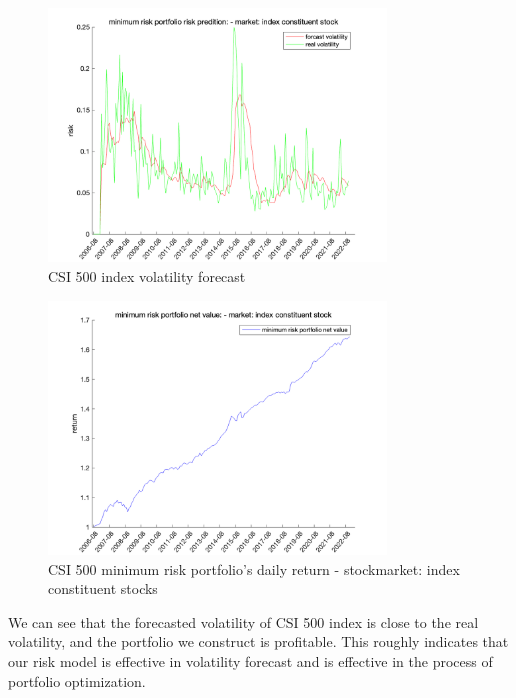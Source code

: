 \documentclass[10pt]{article}
\begin{document}
\begin{figure}[H]
    \centering
     \includegraphics[width=0.8\textwidth]{ZZ500 volatility forecast_new.png}
    \caption{CSI 500 index volatility forecast}
    \label{fig:Fig8}
\end{figure}

\begin{figure}[H]
    \centering
     \includegraphics[width=0.8\textwidth]{ZZ500 minimum risk daily return_new.png}
    \caption{CSI 500 minimum risk portfolio's daily return - stockmarket: index constituent stocks}
    \label{fig:Fig9}
\end{figure}

We can see that the forecasted volatility of CSI 500 index is close to the real volatility, and the portfolio we construct is profitable. This roughly indicates that our risk model is effective in volatility forecast and is effective in the process of portfolio optimization.
\end{document}
